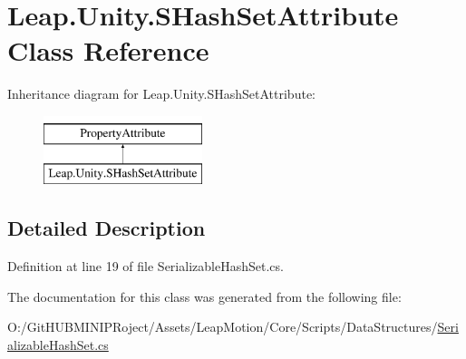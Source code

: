 \hypertarget{class_leap_1_1_unity_1_1_s_hash_set_attribute}{}\section{Leap.\+Unity.\+S\+Hash\+Set\+Attribute Class Reference}
\label{class_leap_1_1_unity_1_1_s_hash_set_attribute}
Inheritance diagram for Leap.\+Unity.\+S\+Hash\+Set\+Attribute\+:\begin{figure}[H]
\begin{center}
\leavevmode
\includegraphics[height=2.000000cm]{class_leap_1_1_unity_1_1_s_hash_set_attribute}
\end{center}
\end{figure}


\subsection{Detailed Description}


Definition at line 19 of file Serializable\+Hash\+Set.\+cs.



The documentation for this class was generated from the following file\+:\begin{DoxyCompactItemize}
\item 
O\+:/\+Git\+H\+U\+B\+M\+I\+N\+I\+P\+Roject/\+Assets/\+Leap\+Motion/\+Core/\+Scripts/\+Data\+Structures/\mbox{\hyperlink{_serializable_hash_set_8cs}{Serializable\+Hash\+Set.\+cs}}\end{DoxyCompactItemize}
